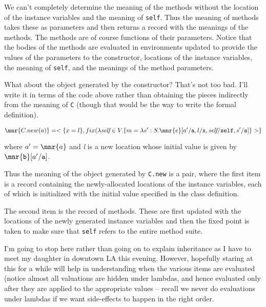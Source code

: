 \documentclass[11pt]{article}
\begin{document}
We can't completely determine the meaning of the methods without the
location of the instance variables and the meaning of \texttt{self}.
Thus the meaning of methods takes these as parameters and then returns
a record with the meanings of the methods.  The methods are of course
functions of their parameters.  Notice that the bodies of the methods
are evaluated in environments updated to provide the values of the
parameters to the constructor, locations of the instance variables,
the meaning of \texttt{self}, and the meanings of the method parameters.

What about the object generated by the constructor?  That's not too 
bad.  I'll write it in terms of the code above rather than obtaining 
the pieces indirectly from the meaning of \texttt{C} (though that 
would be the way to write the formal definition).


$$\mnr{C.new(a)} = <\{x = l\},fix(\lambda \textit{self}
\in V.\{m = \lambda
s':S.\mnr{e}[a'/\texttt{a},l/\texttt{x},\textit{self}/
\texttt{self},s'/\texttt{s}]\}>\}$$

\noindent where $a' = \mnr{a}$ and \textit{l} is a new location whose 
initial value is given by $\mnr{\texttt{b}}[a'/\texttt{a}]$.

Thus the meaning of the object generated by \texttt{C.new} is a pair, 
where the first item is a record containing the newly-allocated 
locations of the instance variables, each of which is initialized 
with the initial value specified in the class definition.

The second item is the record of methods.  These are first updated
with the locations of the newly generated instance variables and then
the fixed point is taken to make sure that \texttt{self} refers to the
entire method suite.

I'm going to stop here rather than going on to explain inheritance as 
I have to meet my daughter in downtown LA this evening.  However, 
hopefully staring at this for a while will help in understanding when 
the various items are evaluated (notice almost all valuations are 
hidden under lambdas, and hence evaluated only after they are applied 
to the appropriate values -- recall we never do evaluations under 
lambdas if we want side-effects to happen in the right order.
\end{document}
